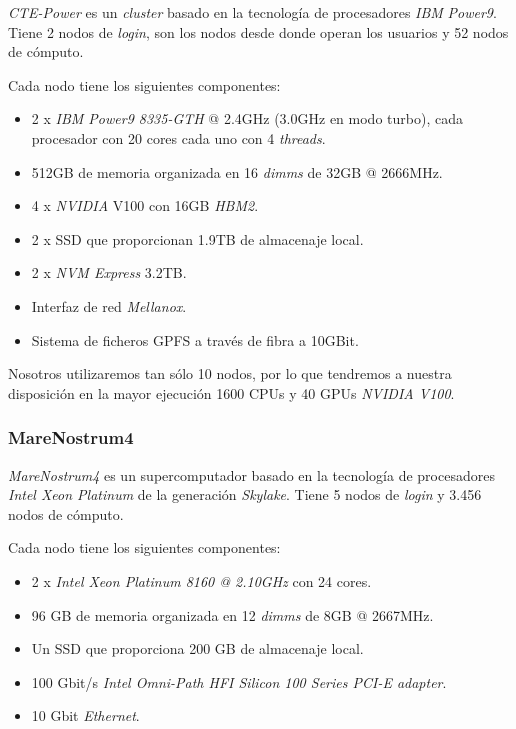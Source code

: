 \textit{CTE-Power} es un \textit{cluster} basado en la tecnología de procesadores \textit{IBM} \textit{Power9}. Tiene 2 nodos de \textit{login}, son los nodos desde donde operan los usuarios y 52 nodos de cómputo. 
\par\smallskip
Cada nodo tiene los siguientes componentes:
\par\smallskip
\begin{itemize}
	\item 2 x \textit{IBM Power9 8335-GTH} @ 2.4GHz (3.0GHz en modo turbo), cada procesador con 20 cores cada uno con 4 \textit{threads}.
	\item 512GB de memoria organizada en 16 \textit{dimms} de 32GB @ 2666MHz.
	\item 4 x \textit{NVIDIA} V100 con 16GB \textit{HBM2}.
	\item 2 x SSD que proporcionan 1.9TB de almacenaje local.
	\item 2 x \textit{NVM Express} 3.2TB.
	\item Interfaz de red \textit{Mellanox}.
	\item Sistema de ficheros GPFS a través de fibra a 10GBit.
\end{itemize}

Nosotros utilizaremos tan sólo 10 nodos, por lo que tendremos a nuestra disposición en la mayor ejecución 1600 CPUs y 40 GPUs \textit{NVIDIA V100}. 

\subsubsection{MareNostrum4}
\label{sec:mare}

\textit{MareNostrum4} es un supercomputador basado en la tecnología de procesadores \textit{Intel Xeon Platinum} de la generación \textit{Skylake}. Tiene 5 nodos de \textit{login} y 3.456 nodos de cómputo.
\par\smallskip
Cada nodo tiene los siguientes componentes:
\par\smallskip
\begin{itemize}
	\item 2 x \textit{Intel Xeon Platinum 8160 @ 2.10GHz} con 24 cores.
	\item 96 GB de memoria organizada en 12 \textit{dimms} de 8GB @ 2667MHz.
	\item Un SSD que proporciona 200 GB de almacenaje local.
	\item 100 Gbit/s \textit{Intel Omni-Path HFI Silicon 100 Series PCI-E adapter}.
	\item 10 Gbit \textit{Ethernet}.
\end{itemize}

